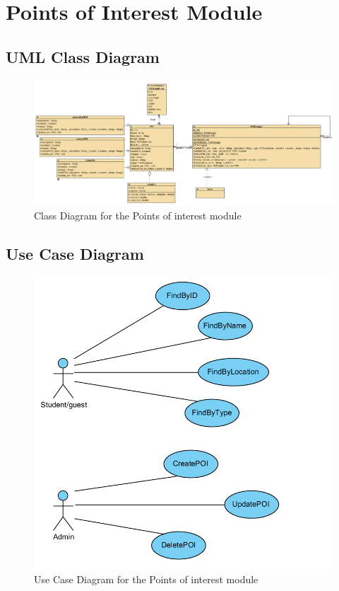 \section{Points of Interest Module}

\subsection{UML Class Diagram}

\begin{figure}[!htb]
\includegraphics[width=\textwidth]{Images/ClassDiagram.png}
\caption{Class Diagram for the Points of interest module}
\end{figure}

\subsection{Use Case Diagram}

\begin{figure}[!htb]
\includegraphics[width=\textwidth]{Images/UseCase.png}
\caption{Use Case Diagram for the Points of interest module}
\end{figure}

